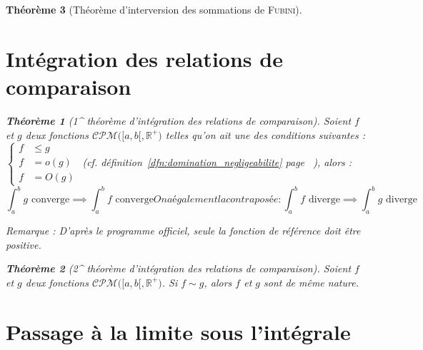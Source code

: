 \documentclass[11pt,a4paper]{report}
\newtheorem{theorem}{Théorème}[chapter]
\newtheorem{itheorem}[theorem]{Théorème}
\theoremstyle{definition}
\begin{document}
\begin{theorem}[Théorème d'interversion des sommations de \textsc{Fubini}]
{{\section{Intégration des relations de comparaison} %
\label{sec:integration_des_relations_de_comparaison}
\begin{itheorem}[1^{} théorème d'intégration des relations de comparaison]
    Soient $f$ et $g$ deux fonctions $\mathcal{CPM}\Big( [a,b[, \ensuremath{\mathbb{R}}^+ \Big)$ telles qu'on ait une des conditions suivantes : $
    \left\lbrace
    \begin{aligned}
        f &\le g    \\
        f &= o(g)   \\
        f &= O(g)
    \end{aligned}
    \right. $ (\textit{cf}. définition~\ref{dfn:domination_negligeabilite} page~\pageref{dfn:domination_negligeabilite}%
    ), alors :
    \begin{subequations}
    \begin{equation}
     \int_a^b g\text{ converge} \implies \int_a^b f\text{ converge}
    \end{equation}
    On a également la contraposée : 
    \begin{equation}
    \int_a^b f\text{ diverge} \implies \int_a^b g\text{ diverge}
    \end{equation}
    \end{subequations}
\end{itheorem}
\emph{Remarque :} D'après le programme officiel, seule la fonction de référence doit être positive. %
\begin{itheorem}[2^{} théorème d'intégration des relations de comparaison]
     Soient $f$ et $g$ deux fonctions $\mathcal{CPM}\Big( [a,b[, \ensuremath{\mathbb{R}}^+ \Big)$. \newline
     Si $f \sim g$, alors $f$ et $g$ sont de même nature.
\end{itheorem}

\section{Passage à la limite sous l'intégrale} %
\label{sec:passage_la_limite_sous_l_integrale}
}}
\end{theorem}
\end{document}
